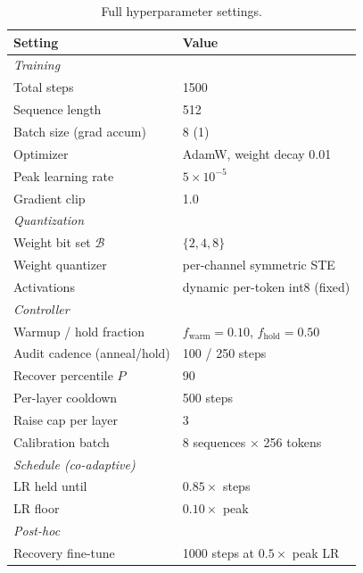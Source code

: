 \documentclass[conference]{IEEEtran}
\begin{document}
\begin{table}[h]
\caption{Full hyperparameter settings.}
\label{tab:hparams}
\begin{center}
\begin{tabular}{ll}
\toprule
\textbf{Setting} & \textbf{Value} \\
\midrule
\multicolumn{2}{l}{\emph{Training}} \\
Total steps                 & 1500 \\
Sequence length             & 512 \\
Batch size (grad accum)     & 8 (1) \\
Optimizer                   & AdamW, weight decay 0.01 \\
Peak learning rate          & $5\times10^{-5}$ \\
Gradient clip               & 1.0 \\
\midrule
\multicolumn{2}{l}{\emph{Quantization}} \\
Weight bit set $\mathcal{B}$ & $\{2,4,8\}$ \\
Weight quantizer            & per-channel symmetric STE \\
Activations                 & dynamic per-token int8 (fixed) \\
\midrule
\multicolumn{2}{l}{\emph{Controller}} \\
Warmup / hold fraction      & $f_{\text{warm}}=0.10$, $f_{\text{hold}}=0.50$ \\
Audit cadence (anneal/hold) & 100 / 250 steps \\
Recover percentile $P$      & 90 \\
Per-layer cooldown          & 500 steps \\
Raise cap per layer         & 3 \\
Calibration batch           & 8 sequences $\times$ 256 tokens \\
\midrule
\multicolumn{2}{l}{\emph{Schedule (co-adaptive)}} \\
LR held until               & $0.85\times$ steps \\
LR floor                    & $0.10\times$ peak \\
\midrule
\multicolumn{2}{l}{\emph{Post-hoc}} \\
Recovery fine-tune          & 1000 steps at $0.5\times$ peak LR \\
\bottomrule
\end{tabular}
\end{center}
\end{table}
\end{document}

